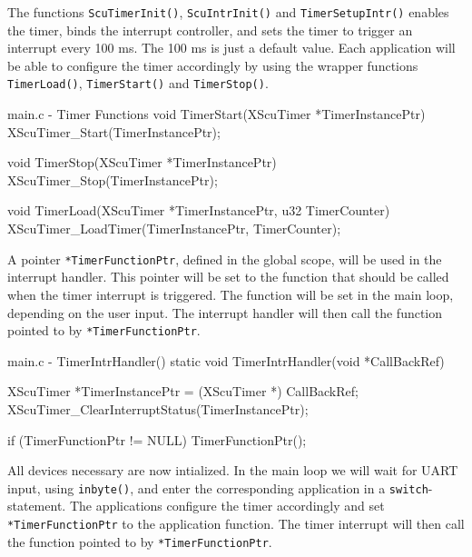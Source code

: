 \documentclass[../main.tex]{subfiles}
\begin{document}
\newpage

The functions \texttt{ScuTimerInit()}, \texttt{ScuIntrInit()} and \texttt{TimerSetupIntr()} enables the timer, binds the interrupt controller, and sets the timer to trigger an interrupt every 100 ms. The 100 ms is just a default value. Each application will be able to configure the timer accordingly by using the wrapper functions \texttt{TimerLoad()}, \texttt{TimerStart()} and \texttt{TimerStop()}.

\begin{myminted}{main.c - Timer Functions}
void TimerStart(XScuTimer *TimerInstancePtr)
{
    XScuTimer_Start(TimerInstancePtr);
}

void TimerStop(XScuTimer *TimerInstancePtr)
{
    XScuTimer_Stop(TimerInstancePtr);
}

void TimerLoad(XScuTimer *TimerInstancePtr, u32 TimerCounter)
{
    XScuTimer_LoadTimer(TimerInstancePtr, TimerCounter);
}
\end{myminted}

A pointer \texttt{*TimerFunctionPtr}, defined in the global scope, will be used in the interrupt handler. This pointer will be set to the function that should be called when the timer interrupt is triggered. The function will be set in the main loop, depending on the user input. The interrupt handler will then call the function pointed to by \texttt{*TimerFunctionPtr}.

\begin{myminted}{main.c - TimerIntrHandler()}
static void TimerIntrHandler(void *CallBackRef)
{
    XScuTimer *TimerInstancePtr = (XScuTimer *) CallBackRef;
    XScuTimer_ClearInterruptStatus(TimerInstancePtr);

    if (TimerFunctionPtr != NULL) {
        TimerFunctionPtr();
    }
}
\end{myminted}

All devices necessary are now intialized. In the main loop we will wait for UART input, using \texttt{inbyte()}, and enter the corresponding application in a \texttt{switch}-statement. The applications configure the timer accordingly and set \texttt{*TimerFunctionPtr} to the application function. The timer interrupt will then call the function pointed to by \texttt{*TimerFunctionPtr}.

\newpage
\end{document}
